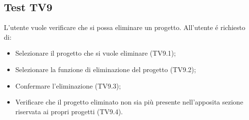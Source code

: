 \subsection{Test TV9}
L'utente vuole verificare che si possa eliminare un progetto. \newline
All'utente \'e richiesto di:
\begin{itemize}
	\item Selezionare il progetto che si vuole eliminare (TV9.1);
	\item Selezionare la funzione di eliminazione del progetto (TV9.2);
	\item Confermare l'eliminazione (TV9.3);
	\item Verificare che il progetto eliminato non sia più presente nell'apposita sezione riservata ai propri progetti (TV9.4).
\end{itemize}